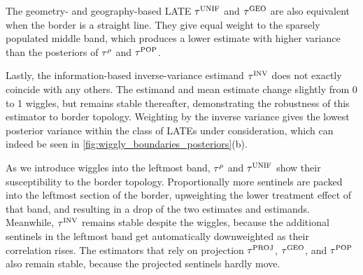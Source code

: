     The geometry- and geography-based LATE \(\tau^{\mathrm{UNIF}}\) and \(\tau^{\mathrm{GEO}}\) are also equivalent when the border is a straight line.
They give equal weight to the sparsely populated middle band, which produces a lower estimate with higher variance than the posteriors of \(\tau^{\rho}\) and \(\tau^{\mathrm{POP}}\).

    Lastly, the information-based inverse-variance estimand \(\tau^{\mathrm{INV}}\) does not exactly coincide with any others.
The estimand and mean estimate change slightly from 0 to 1 wiggles, but remains stable thereafter, demonstrating the robustness of this estimator to border topology.
Weighting by the inverse variance gives the lowest posterior variance within the class of LATEs under consideration, which can indeed be seen in \autoref{fig:wiggly_boundaries_posteriors}(b).

    As we introduce wiggles into the leftmost band,
\(\tau^{\rho}\) and \(\tau^{\mathrm{UNIF}}\) show their susceptibility to the border topology.
Proportionally more sentinels are packed into the leftmost section of the border,
upweighting the lower treatment effect of that band,
and resulting in a drop of the two estimates and estimands.
Meanwhile, \(\tau^{\mathrm{INV}}\) remains stable despite the wiggles,
because the additional sentinels in the leftmost
band get automatically downweighted as their correlation rises.
The estimators that rely on projection
\(\tau^{\mathrm{PROJ}}\), \(\tau^{\mathrm{GEO}}\), and \(\tau^{\mathrm{POP}}\) also remain stable,
because the projected sentinels hardly move.

